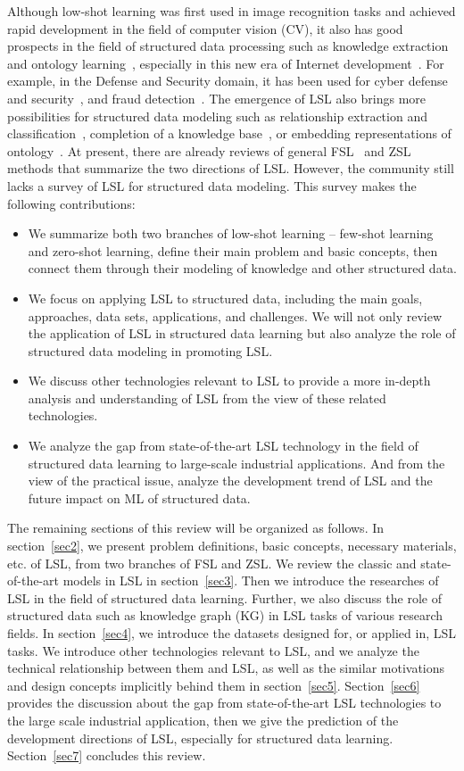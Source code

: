 Although low-shot learning was first used in image recognition tasks and achieved rapid development in the field of computer vision (CV), it also has good prospects in the field of structured data processing such as knowledge extraction and ontology learning~, especially in this new era of Internet development~. For example, in the Defense and Security domain, it has been used for cyber defense and security~, and fraud detection~. The emergence of LSL also brings more possibilities for structured data modeling such as relationship extraction and classification~,  completion of a knowledge base~, or  embedding representations of ontology~.
At present, there are already reviews of general FSL~ and ZSL~ methods that summarize the two directions of LSL. However, the community still lacks a survey of LSL for structured data modeling. This survey makes the following contributions:
\begin{itemize}
\item We summarize both two branches of low-shot learning -- few-shot learning and zero-shot learning, define their main problem and basic concepts, then connect them through their modeling of knowledge and other structured data.
\item We focus on applying LSL to structured data, including the main goals, approaches, data sets, applications, and challenges. We will not only review the application of LSL in structured data learning but also analyze the role of structured data modeling in promoting LSL.
\item We discuss other technologies relevant to LSL to provide a more in-depth analysis and understanding of LSL from the view of these related technologies.
\item We analyze the gap from state-of-the-art LSL technology in the field of structured data learning to large-scale industrial applications. And from the view of the practical issue, analyze the development trend of LSL and the future impact on ML of structured data.
\end{itemize}
The remaining sections of this review will be organized as follows. In section~\ref{sec2}, we present problem definitions, basic concepts, necessary materials, etc. of LSL, from two branches of FSL and ZSL.  We review the classic and state-of-the-art models in LSL in section~\ref{sec3}. Then we introduce the researches of LSL in the field of structured data learning. Further, we also discuss the role of structured data such as knowledge graph (KG) in LSL tasks of
various research fields. In section~\ref{sec4}, we introduce the datasets designed for, or applied in, LSL tasks. We introduce other technologies relevant to LSL, and we analyze the technical relationship between them and LSL, as well as the similar motivations and design concepts implicitly behind them  in section~\ref{sec5}. Section~\ref{sec6} provides the discussion about the gap from state-of-the-art LSL technologies to the large scale industrial application, then we give the prediction of the development directions of LSL, especially for structured data learning. Section~\ref{sec7} concludes this review.

